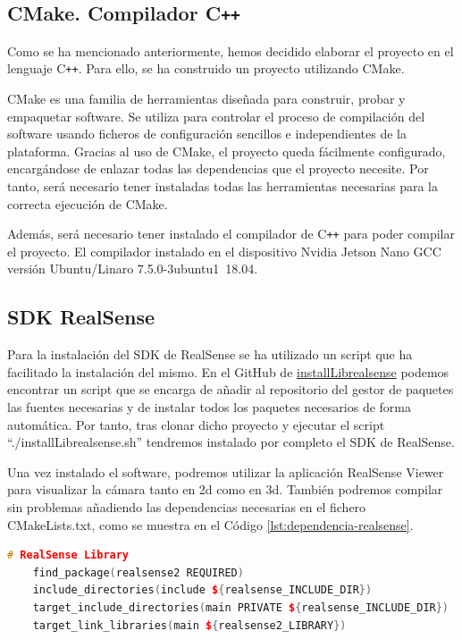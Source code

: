 \subsection{CMake. Compilador C\texttt{++}}

Como se ha mencionado anteriormente, hemos decidido elaborar el proyecto en el lenguaje C\texttt{++}. Para ello, se ha construido un proyecto utilizando CMake.

CMake es una familia de herramientas diseñada para construir, probar y empaquetar software.
Se utiliza para controlar el proceso de compilación del software usando ficheros de configuración sencillos e independientes de la plataforma.
Gracias al uso de CMake, el proyecto queda fácilmente configurado, encargándose de enlazar todas las dependencias que el proyecto necesite.
Por tanto, será necesario tener instaladas todas las herramientas necesarias para la correcta ejecución de CMake.

Además, será necesario tener instalado el compilador de C\texttt{++} para poder compilar el proyecto. El compilador instalado en el dispositivo Nvidia Jetson Nano GCC versión Ubuntu/Linaro 7.5.0-3ubuntu1~18.04.

\subsection{SDK RealSense}

Para la instalación del SDK de RealSense se ha utilizado un script que ha facilitado la instalación del mismo.
En el GitHub de \href{https://github.com/JetsonHacksNano/installLibrealsense}{installLibrealsense} podemos encontrar un script que se encarga de añadir al repositorio del gestor de paquetes las fuentes necesarias y de instalar todos los paquetes necesarios de forma automática.
Por tanto, tras clonar dicho proyecto y ejecutar el script ``./installLibrealsense.sh'' tendremos instalado por completo el SDK de RealSense.

Una vez instalado el software, podremos utilizar la aplicación RealSense Viewer para visualizar la cámara tanto en \gls{2d} como en \gls{3d}.
También podremos compilar sin problemas añadiendo las dependencias necesarias en el fichero CMakeLists.txt, como se muestra en el Código \ref{lst:dependencia-realsense}.

\begin{lstlisting}[language={C++}, caption={Dependencia CMakeLists: RealSense Library}, label={lst:dependencia-realsense}]
    # RealSense Library
    find_package(realsense2 REQUIRED)
    include_directories(include ${realsense_INCLUDE_DIR})
    target_include_directories(main PRIVATE ${realsense_INCLUDE_DIR})
    target_link_libraries(main ${realsense2_LIBRARY})
\end{lstlisting}

